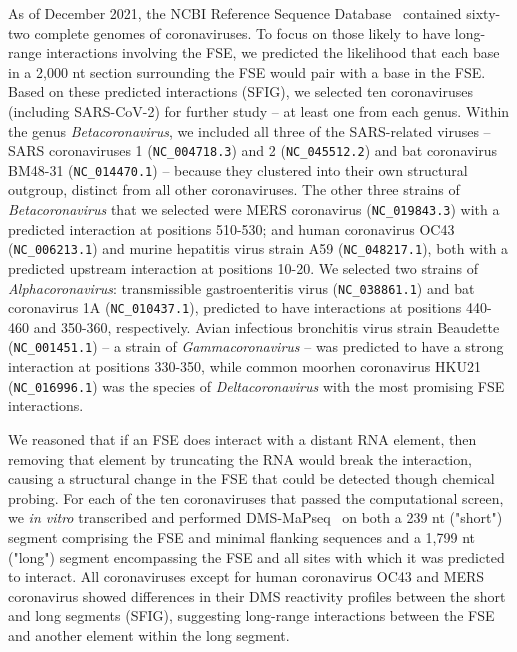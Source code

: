 \documentclass[main.tex]{subfiles}
\begin{document}
As of December 2021, the NCBI Reference Sequence Database~\cite{OLeary2016} contained sixty-two complete genomes of coronaviruses.
To focus on those likely to have long-range interactions involving the FSE, we predicted the likelihood that each base in a 2,000 nt section surrounding the FSE would pair with a base in the FSE.
Based on these predicted interactions (SFIG), we selected ten coronaviruses (including SARS-CoV-2) for further study -- at least one from each genus.
Within the genus \textit{Betacoronavirus}, we included all three of the SARS-related viruses -- SARS coronaviruses 1 (\verb|NC_004718.3|) and 2 (\verb|NC_045512.2|) and bat coronavirus BM48-31 (\verb|NC_014470.1|) -- because they clustered into their own structural outgroup, distinct from all other coronaviruses.
The other three strains of \textit{Betacoronavirus} that we selected were MERS coronavirus (\verb|NC_019843.3|) with a predicted interaction at positions 510-530; and human coronavirus OC43 (\verb|NC_006213.1|) and murine hepatitis virus strain A59 (\verb|NC_048217.1|), both with a predicted upstream interaction at positions 10-20.
We selected two strains of \textit{Alphacoronavirus}: transmissible gastroenteritis virus (\verb|NC_038861.1|) and bat coronavirus 1A (\verb|NC_010437.1|), predicted to have interactions at positions 440-460 and 350-360, respectively.
Avian infectious bronchitis virus strain Beaudette (\verb|NC_001451.1|) -- a strain of \textit{Gammacoronavirus} -- was predicted to have a strong interaction at positions 330-350, while common moorhen coronavirus HKU21 (\verb|NC_016996.1|) was the species of \textit{Deltacoronavirus} with the most promising FSE interactions.

We reasoned that if an FSE does interact with a distant RNA element, then removing that element by truncating the RNA would break the interaction, causing a structural change in the FSE that could be detected though chemical probing.
For each of the ten coronaviruses that passed the computational screen, we \textit{in vitro} transcribed and performed DMS-MaPseq~\cite{Zubradt2016} on both a 239 nt ("short") segment comprising the FSE and minimal flanking sequences and a 1,799 nt ("long") segment encompassing the FSE and all sites with which it was predicted to interact.
All coronaviruses except for human coronavirus OC43 and MERS coronavirus showed differences in their DMS reactivity profiles between the short and long segments (SFIG), suggesting long-range interactions between the FSE and another element within the long segment.
\end{document}
